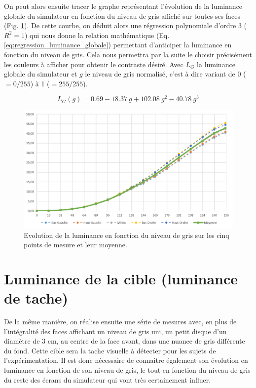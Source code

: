 	\par On peut alors ensuite tracer le graphe représentant l'évolution de la luminance globale du simulateur en fonction du niveau de gris affiché sur toutes ses faces (Fig. \ref{fig:evolution_luminance_background}). De cette courbe, on déduit alors une régression polynomiale d'ordre 3 ($R^2 = 1$) qui nous donne la relation mathématique (Eq. \ref{eq:regression_luminance_globale}) permettant d'anticiper la luminance en fonction du niveau de gris. Cela nous permettra par la suite le choisir précisément les couleurs à afficher pour obtenir le contraste désiré. Avec $L_G$ la luminance globale du simulateur et $g$ le niveau de gris normalisé, c'est à dire variant de 0 ($= 0/255$) à 1 ($= 255/255$).
	
	\begin{equation}
		L_G(g) = 0.69 - 18.37~g + 102.08~g^2 -40.78~g^3
		\label{eq:regression_luminance_globale}
	\end{equation}
	
	\begin{figure}
		\centering
		\includegraphics[scale=.75]{Figures/EvolutionLuminanceGlobale}
		\caption{Evolution de la luminance en fonction du niveau de gris sur les cinq points de mesure et leur moyenne.}
		\label{fig:evolution_luminance_background}
	\end{figure}
	
	\section{Luminance de la cible (luminance de tache)}
	\par De la même manière, on réalise ensuite une série de mesures avec, en plus de l'intégralité des faces affichant un niveau de gris uni, un petit disque d'un diamètre de 3 cm, au centre de la face avant, dans une nuance de gris différente du fond. Cette cible sera la tache visuelle à détecter pour les sujets de l'expérimentation. Il est donc nécessaire de connaitre également son évolution en luminance en fonction de son niveau de gris, le tout en fonction du niveau de gris du reste des écrans du simulateur qui vont très certainement influer.
	
